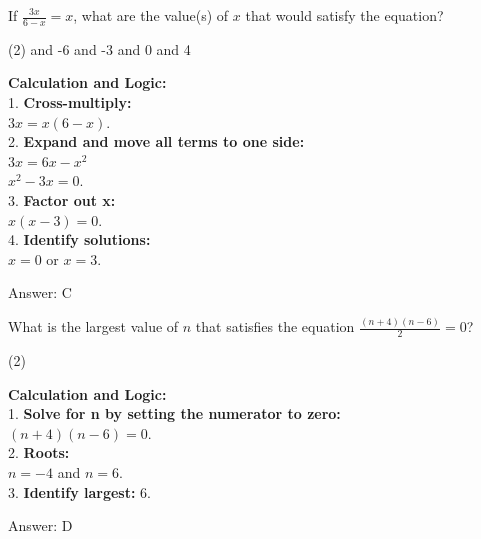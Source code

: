 \documentclass[11pt,paper=a4,answers]{exam}
\begin{document}
\begin{questions}
\question
If $\frac{3x}{6 - x} = x$, what are the value(s) of $x$ that would satisfy the equation?
\begin{tasks}(2)
     and -6
     and -3
     and 0
     and 4
\end{tasks}

\begin{solution}
\textbf{Calculation and Logic:} \\
1. \textbf{Cross-multiply:} \\
   $3x = x(6 - x)$. \\
2. \textbf{Expand and move all terms to one side:} \\
   $3x = 6x - x^2$ \\
   $x^2 - 3x = 0$. \\
3. \textbf{Factor out x:} \\
   $x(x - 3) = 0$. \\
4. \textbf{Identify solutions:} \\
   $x = 0$ or $x = 3$.

\vspace{30pt}

Answer: \colorbox{yellow!100}{C}
\end{solution}

\vspace{60pt}

\question
What is the largest value of $n$ that satisfies the equation $\frac{(n + 4)(n - 6)}{2} = 0$?
\begin{tasks}(2)
\end{tasks}

\begin{solution}
\textbf{Calculation and Logic:} \\
1. \textbf{Solve for n by setting the numerator to zero:} \\
   $(n + 4)(n - 6) = 0$. \\
2. \textbf{Roots:} \\
   $n = -4$ and $n = 6$. \\
3. \textbf{Identify largest:} 6.

\vspace{30pt}

Answer: \colorbox{yellow!100}{D}
\end{solution}


\end{questions}
\end{document}
